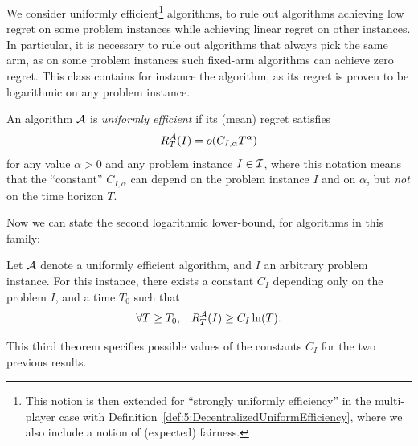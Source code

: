 We consider uniformly efficient\footnote{This notion is then extended for ``strongly uniformly efficiency'' in the multi-player case with Definition~\ref{def:5:DecentralizedUniformEfficiency}, where we also include a notion of (expected) fairness.} algorithms, to rule out algorithms achieving low regret on some problem instances while achieving linear regret on other instances.
In particular, it is necessary to rule out algorithms that always pick the same arm, as on some problem instances such fixed-arm algorithms can achieve zero regret.
This class contains for instance the \UCB{} algorithm, as its regret is proven to be logarithmic on any problem instance.

\begin{defn}\label{def:2:uniformlyEfficientAlgorithm}
    An algorithm $\mathcal{A}$ is \emph{uniformly efficient} if its (mean) regret satisfies
    \begin{equation}
        R_T^{\mathcal{A}}(I) = \mathop{}\mathopen{}o\mathopen{}\left(C_{I,\alpha} T^{\alpha}\right)
    \end{equation}
    for any value $\alpha>0$ and any problem instance $I\in \mathcal{I}$,
    where this notation means that the ``constant'' $C_{I,\alpha}$ can depend on the problem instance $I$ and on $\alpha$, but \emph{not} on the time horizon $T$.
\end{defn}

Now we can state the second logarithmic lower-bound, for algorithms in this family:

\begin{theorem}\label{thm:2:secondLogTLowerBound}
    Let $\mathcal{A}$ denote a uniformly efficient algorithm,
    and $I$ an arbitrary problem instance.
    For this instance,
    there exists a constant $C_I$ depending only on the problem $I$,
    and a time $T_0$ such that
    \begin{equation}
        \forall T \geq T_0, \;\;\; R_T^{\mathcal{A}}(I) \geq C_I \ln(T).
    \end{equation}
\end{theorem}

This third theorem specifies possible values of the constants $C_I$ for the two previous results.

